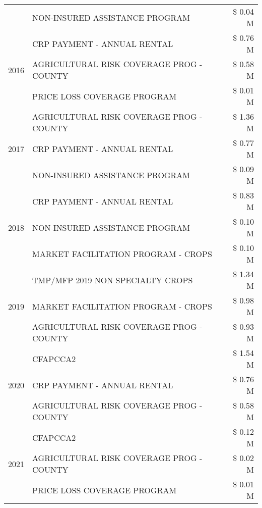 \begin{tabular}{llr}
 & NON-INSURED ASSISTANCE PROGRAM & \$ 0.04 M \\
\cline{1-3}
\multirow[t]{3}{*}{2016} & CRP PAYMENT - ANNUAL RENTAL & \$ 0.76 M \\
 & AGRICULTURAL RISK COVERAGE PROG - COUNTY & \$ 0.58 M \\
 & PRICE LOSS COVERAGE PROGRAM & \$ 0.01 M \\
\cline{1-3}
\multirow[t]{3}{*}{2017} & AGRICULTURAL RISK COVERAGE PROG - COUNTY & \$ 1.36 M \\
 & CRP PAYMENT - ANNUAL RENTAL & \$ 0.77 M \\
 & NON-INSURED ASSISTANCE PROGRAM & \$ 0.09 M \\
\cline{1-3}
\multirow[t]{3}{*}{2018} & CRP PAYMENT - ANNUAL RENTAL & \$ 0.83 M \\
 & NON-INSURED ASSISTANCE PROGRAM & \$ 0.10 M \\
 & MARKET FACILITATION PROGRAM - CROPS & \$ 0.10 M \\
\cline{1-3}
\multirow[t]{3}{*}{2019} & TMP/MFP 2019 NON SPECIALTY CROPS & \$ 1.34 M \\
 & MARKET FACILITATION PROGRAM - CROPS & \$ 0.98 M \\
 & AGRICULTURAL RISK COVERAGE PROG - COUNTY & \$ 0.93 M \\
\cline{1-3}
\multirow[t]{3}{*}{2020} & CFAPCCA2 & \$ 1.54 M \\
 & CRP PAYMENT - ANNUAL RENTAL & \$ 0.76 M \\
 & AGRICULTURAL RISK COVERAGE PROG - COUNTY & \$ 0.58 M \\
\cline{1-3}
\multirow[t]{3}{*}{2021} & CFAPCCA2 & \$ 0.12 M \\
 & AGRICULTURAL RISK COVERAGE PROG - COUNTY & \$ 0.02 M \\
 & PRICE LOSS COVERAGE PROGRAM & \$ 0.01 M \\
\cline{1-3}
\bottomrule
\end{tabular}
